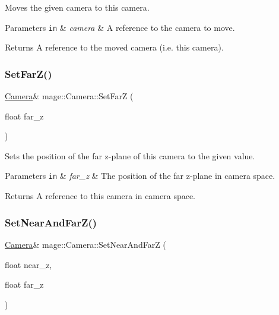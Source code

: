 Moves the given camera to this camera.


\begin{DoxyParams}[1]{Parameters}
\mbox{\tt in}  & {\em camera} & A reference to the camera to move. \\
\hline
\end{DoxyParams}
\begin{DoxyReturn}{Returns}
A reference to the moved camera (i.\+e. this camera). 
\end{DoxyReturn}
\hypertarget{classmage_1_1_camera_a2643b1e8946767a4b3d139e86b1b913f}{}\label{classmage_1_1_camera_a2643b1e8946767a4b3d139e86b1b913f} 
\subsubsection{\texorpdfstring{Set\+Far\+Z()}{SetFarZ()}}
{\footnotesize\ttfamily \hyperlink{classmage_1_1_camera}{Camera}\& mage\+::\+Camera\+::\+Set\+FarZ (\begin{DoxyParamCaption}\item[{float}]{far\+\_\+z }\end{DoxyParamCaption})\hspace{0.3cm}{\ttfamily [noexcept]}}

Sets the position of the far z-\/plane of this camera to the given value.


\begin{DoxyParams}[1]{Parameters}
\mbox{\tt in}  & {\em far\+\_\+z} & The position of the far z-\/plane in camera space. \\
\hline
\end{DoxyParams}
\begin{DoxyReturn}{Returns}
A reference to this camera in camera space. 
\end{DoxyReturn}
\hypertarget{classmage_1_1_camera_ad31923fb81a727aadd58399e8485fc35}{}\label{classmage_1_1_camera_ad31923fb81a727aadd58399e8485fc35} 
\subsubsection{\texorpdfstring{Set\+Near\+And\+Far\+Z()}{SetNearAndFarZ()}}
{\footnotesize\ttfamily \hyperlink{classmage_1_1_camera}{Camera}\& mage\+::\+Camera\+::\+Set\+Near\+And\+FarZ (\begin{DoxyParamCaption}\item[{float}]{near\+\_\+z,  }\item[{float}]{far\+\_\+z }\end{DoxyParamCaption})\hspace{0.3cm}{\ttfamily [noexcept]}}

